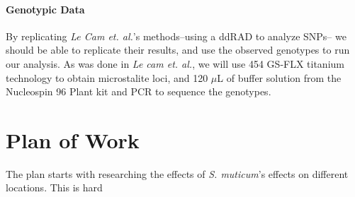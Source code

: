 \documentclass[12pt]{extarticle}
\begin{document}
\paragraph{Genotypic Data}
By replicating \textit{Le Cam et. al.}'s methods--using a ddRAD to analyze SNPs-- we should be able to replicate their results, and use the observed genotypes to run our analysis. As was done in \textit{Le cam et. al.}, we will use 454 GS‐FLX titanium technology to obtain microstalite loci, and 120 $\mu$L of buffer solution from the Nucleospin 96 Plant kit and PCR to sequence the genotypes.
\section{Plan of Work}
The plan starts with researching the effects of \textit{S. muticum}'s effects on different locations.
This is hard 


\FloatBarrier


\end{document}
